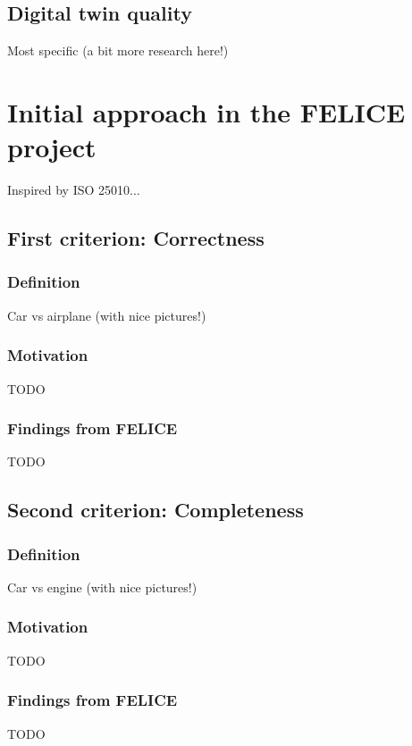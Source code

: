 \documentclass[9pt,conference]{IEEEtran}
\begin{document}
    \subsection{Digital twin quality}
    Most specific (a bit more research here!)

    \section{Initial approach in the FELICE project}
    Inspired by ISO 25010...

    \subsection{First criterion: Correctness}
    
    \subsubsection{Definition}
    Car vs airplane (with nice pictures!)

    \subsubsection{Motivation}
    TODO

    \subsubsection{Findings from FELICE}
    TODO

    \subsection{Second criterion: Completeness}
    
    \subsubsection{Definition}
    Car vs engine (with nice pictures!)

    \subsubsection{Motivation}
    TODO

    \subsubsection{Findings from FELICE}
    TODO
\end{document}
